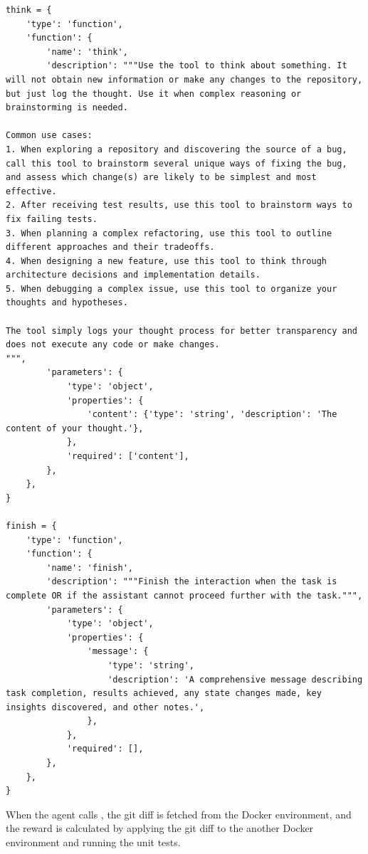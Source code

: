 {\begin{Verbatim}[breaklines, breakanywhere]
think = {
    'type': 'function',
    'function': {
        'name': 'think',
        'description': """Use the tool to think about something. It will not obtain new information or make any changes to the repository, but just log the thought. Use it when complex reasoning or brainstorming is needed.

Common use cases:
1. When exploring a repository and discovering the source of a bug, call this tool to brainstorm several unique ways of fixing the bug, and assess which change(s) are likely to be simplest and most effective.
2. After receiving test results, use this tool to brainstorm ways to fix failing tests.
3. When planning a complex refactoring, use this tool to outline different approaches and their tradeoffs.
4. When designing a new feature, use this tool to think through architecture decisions and implementation details.
5. When debugging a complex issue, use this tool to organize your thoughts and hypotheses.

The tool simply logs your thought process for better transparency and does not execute any code or make changes.
""",
        'parameters': {
            'type': 'object',
            'properties': {
                'content': {'type': 'string', 'description': 'The content of your thought.'},
            },
            'required': ['content'],
        },
    },
}

finish = {
    'type': 'function',
    'function': {
        'name': 'finish',
        'description': """Finish the interaction when the task is complete OR if the assistant cannot proceed further with the task.""",
        'parameters': {
            'type': 'object',
            'properties': {
                'message': {
                    'type': 'string',
                    'description': 'A comprehensive message describing task completion, results achieved, any state changes made, key insights discovered, and other notes.',
                },
            },
            'required': [],
        },
    },
}
\end{Verbatim}
}
When the agent calls , the git diff is fetched from the Docker environment, and the reward is calculated by applying the git diff to the another Docker environment and running the unit tests.


